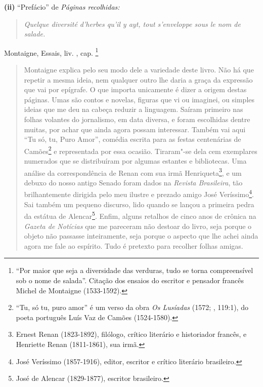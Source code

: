 \textbf{(ii)} ``Prefácio'' de \emph{Páginas recolhidas: }

\begin{quote}
\emph{Quelque diversité d'herbes qu'il y ayt, tout s'enveloppe sous le
nom de salade. }
\end{quote}

\begin{flushright}
Montaigne, Essais, liv. , cap. \footnote{``Por maior que seja a
  diversidade das verduras, tudo se torna compreensível sob o nome de
  salada''. Citação dos ensaios do escritor e pensador francês Michel de
  Montaigne (1533-1592).}
\end{flushright}

\begin{quote}
Montaigne explica pelo seu modo dele a variedade deste livro. Não há que
repetir a mesma ideia, nem qualquer outro lhe daria a graça da expressão
que vai por epígrafe. O que importa unicamente é dizer a origem destas
páginas. Umas são contos e novelas, figuras que vi ou imaginei, ou
simples ideias que me deu na cabeça reduzir a linguagem. Saíram primeiro
nas folhas volantes do jornalismo, em data diversa, e foram escolhidas
dentre muitas, por achar que ainda agora possam interessar. Também vai
aqui ``Tu só, tu, Puro Amor'', comédia escrita para as festas
centenárias de Camões\footnote{``Tu, só tu, puro amor'' é um verso da
  obra \emph{Os Lusíadas} (1572; , 119:1), do poeta português Luís
  Vaz de Camões (1524-1580).} e representada por essa ocasião.
Tiraram"-se dela cem exemplares numerados que se distribuíram por algumas
estantes e bibliotecas. Uma análise da correspondência de Renan com sua
irmã Henriqueta\footnote{Ernest Renan (1823-1892), filólogo, crítico
  literário e historiador francês, e Henriette Renan (1811-1861), sua
  irmã.}, e um debuxo do nosso antigo Senado foram dados na
\emph{Revista Brasileira}, tão brilhantemente dirigida pelo meu ilustre
e prezado amigo José Veríssimo\footnote{José Veríssimo (1857-1916),
  editor, escritor e crítico literário brasileiro.}. Sai também um
pequeno discurso, lido quando se lançou a primeira pedra da estátua de
Alencar\footnote{José de Alencar (1829-1877), escritor brasileiro.}.
Enfim, alguns retalhos de cinco anos de crônica na \emph{Gazeta de
Notícias} que me pareceram não destoar do livro, seja porque o objeto
não passasse inteiramente, seja porque o aspecto que lhe achei ainda
agora me fale ao espírito. Tudo é pretexto para recolher folhas amigas.
\end{quote}


